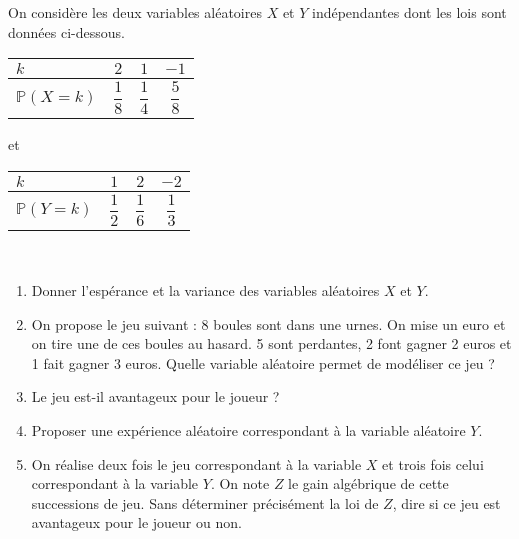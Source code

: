 \documentclass[11pt,fleqn, openany]{book} %
\begin{document}
\begin{exercise}[topic=lgn02]On considère les deux variables aléatoires $X$ et $Y$ indépendantes dont les lois sont données ci-dessous.

\renewcommand{\arraystretch}{2.2}
\hfill
\begin{tabular}{|l|c|c|c|}
\hline
$k$ & $2$& $1$ & $-1$  \\
\hline
$\mathbb{P}(X=k)$ & $\dfrac{1}{8}$ & $\dfrac{1}{4}$ & $\dfrac{5}{8}$ \\
\hline \end{tabular}\hfill
et
\hfill
\begin{tabular}{|l|c|c|c|}
\hline
$k$ & $1$& $2$ & $-2$ \\
\hline
$\mathbb{P}(Y=k)$ & $\dfrac{1}{2}$ & $\dfrac{1}{6}$ & $\dfrac{1}{3}$ \\
\hline \end{tabular}\hfill~

\begin{enumerate}
\item Donner l'espérance et la variance des variables aléatoires $X$ et $Y$.
\item On propose le jeu suivant : 8 boules sont dans une urnes. On mise un euro et on tire une de ces boules au hasard. 5 sont perdantes, 2 font gagner 2 euros et 1 fait gagner 3 euros. Quelle variable aléatoire permet de modéliser ce jeu ?
\item Le jeu est-il avantageux pour le joueur ?
\item Proposer une expérience aléatoire correspondant à la variable aléatoire $Y$.
\item On réalise deux fois le jeu correspondant à la variable $X$ et trois fois celui correspondant à la variable $Y$. On note $Z$ le gain algébrique de cette successions de jeu. Sans déterminer précisément la loi de $Z$, dire si ce jeu est avantageux pour le joueur ou non.
\end{enumerate}\end{exercise}
\end{document}
